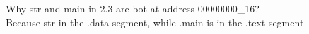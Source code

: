 \documentclass{article}
\begin{document}
Why str and main in 2.3 are bot at address 00000000_{16}?\\
Because str in the .data segment, while .main is in the .text segment
\end{document}
